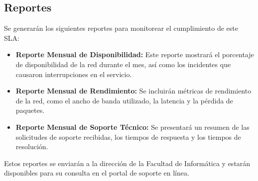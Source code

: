 \subsection{Reportes}

Se generarán los siguientes reportes para monitorear el cumplimiento de este SLA:

\begin{itemize}
    \item \textbf{Reporte Mensual de Disponibilidad:} Este reporte mostrará el porcentaje de disponibilidad de la red durante el mes, así como los incidentes que causaron interrupciones en el servicio.
    \item \textbf{Reporte Mensual de Rendimiento:} Se incluirán métricas de rendimiento de la red, como el ancho de banda utilizado, la latencia y la pérdida de paquetes.
    \item \textbf{Reporte Mensual de Soporte Técnico:} Se presentará un resumen de las solicitudes de soporte recibidas, los tiempos de respuesta y los tiempos de resolución.
\end{itemize}

Estos reportes se enviarán a la dirección de la Facultad de Informática y estarán disponibles para su consulta en el portal de soporte en línea.
